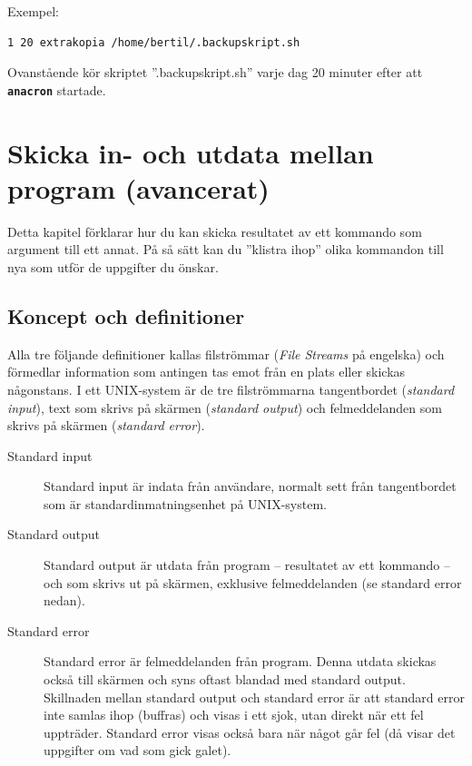 \documentclass[10pt,a4paper,final]{book}
\newcommand{\xeng}[1]{\textit{#1} på engelska}
\newcommand{\xintro}[1]{{\Large #1\par}\vspace{.5\baselineskip}}
\newcommand{\xcommandstyle}[1]{\textbf{\texttt{#1}}}
\newcommand{\xcommand}[1]{\index{#1}\xcommandstyle{#1}}
\begin{document}
Exempel:

\begin{verbatim}
1 20 extrakopia /home/bertil/.backupskript.sh
\end{verbatim}

Ovanstående kör skriptet ''.backupskript.sh'' varje dag 20 minuter efter att \xcommand{anacron} startade.

\chapter{Skicka in- och utdata mellan program (avancerat)}\label{cha:io}

\xintro{Detta kapitel förklarar hur du kan skicka resultatet av ett kommando som argument till ett annat. På så sätt kan du ''klistra ihop'' olika kommandon till nya som utför de uppgifter du önskar.}

\section{Koncept och definitioner}

Alla tre följande definitioner kallas filströmmar (\xeng{File Streams}) och förmedlar information som antingen tas emot från en plats eller skickas någonstans. I ett UNIX-system är de tre filströmmarna tangentbordet (\textit{standard input}), text som skrivs på skärmen (\textit{standard output}) och felmeddelanden som skrivs på skärmen (\textit{standard error}).

\begin{description}
\item[Standard input]{Standard input är indata från användare, normalt sett från tangentbordet som är standardinmatningsenhet på UNIX-system.}

\item[Standard output]{Standard output är utdata från program -- resultatet av ett kommando -- och som skrivs ut på skärmen, exklusive felmeddelanden (se standard error nedan).}

\item[Standard error]{Standard error är felmeddelanden från program. Denna utdata skickas också till skärmen och syns oftast blandad med standard output. Skillnaden mellan standard output och standard error är att standard error inte samlas ihop (buffras) och visas i ett sjok, utan direkt när ett fel uppträder. Standard error visas också bara när något går fel (då visar det uppgifter om vad som gick galet).}

\end{description}
\end{document}
